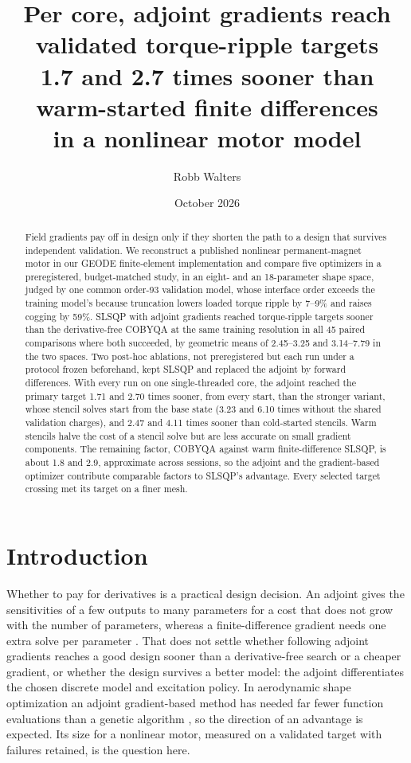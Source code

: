 \documentclass{anvil-paper}
\title{Per core, adjoint gradients reach validated torque-ripple targets\\
1.7 and 2.7 times sooner than warm-started finite differences\\in a nonlinear motor model}
\author{Robb Walters}
\date{October 2026}
\begin{document}
\maketitle
\begin{abstract}
Field gradients pay off in design only if they shorten the path to a
design that survives independent validation. We reconstruct a published
nonlinear permanent-magnet motor in our GEODE finite-element
implementation and compare five optimizers in a preregistered,
budget-matched study, in an eight- and an 18-parameter shape space, judged
by one common order-93 validation model, whose interface order exceeds the
training model's because truncation lowers loaded torque ripple by 7--9\%
and raises cogging by 59\%. SLSQP with adjoint gradients reached
torque-ripple targets sooner than the derivative-free COBYQA at the same
training resolution in all 45 paired comparisons where both succeeded, by
geometric means of 2.45--3.25 and 3.14--7.79 in the two spaces. Two
post-hoc ablations, not preregistered but each run under a protocol frozen
beforehand, kept SLSQP and replaced the adjoint by forward differences.
With every run on one single-threaded core, the adjoint reached the primary
target 1.71 and 2.70 times sooner, from every start, than the stronger
variant, whose stencil solves start from the base state (3.23 and 6.10
times without the shared validation charges), and 2.47 and 4.11 times
sooner than cold-started stencils. Warm stencils halve the cost of a
stencil solve but are less accurate on small gradient components. The
remaining factor, COBYQA against warm finite-difference SLSQP, is about 1.8
and 2.9, approximate across sessions, so the adjoint and the gradient-based
optimizer contribute comparable factors to SLSQP's advantage. Every
selected target crossing met its target on a finer mesh.
\end{abstract}

\section{Introduction}
Whether to pay for derivatives is a practical design decision. An adjoint
gives the sensitivities of a few outputs to many parameters for a cost
that does not grow with the number of parameters, whereas a
finite-difference gradient needs one extra solve per parameter
\citep{giles2000introduction,martins2013review}. That does not settle
whether following adjoint gradients reaches a good design sooner than a
derivative-free search or a cheaper gradient, or whether the design
survives a better model: the adjoint differentiates the chosen discrete
model and excitation policy. In aerodynamic shape optimization an adjoint
gradient-based method has needed far fewer function evaluations than a
genetic algorithm \citep{zingg2008comparative}, so the direction of an
advantage is expected. Its size for a nonlinear motor, measured on a
validated target with failures retained, is the question here.
\end{document}
